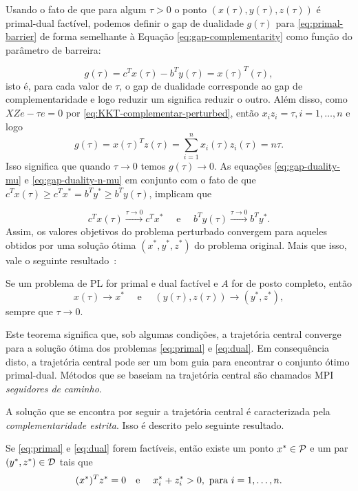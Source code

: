 Usando o fato de que para algum $\tau>0$ o ponto $(x(\tau),y(\tau),z(\tau))$ é
primal-dual factível, podemos definir o gap de dualidade $g(\tau)$ para \eqref{eq:primal-barrier}
de forma semelhante à Equação \eqref{eq:gap-complementarity} como função do
parâmetro de barreira:

\begin{equation}
\label{eq:gap-duality-mu}
g(\tau) = c^Tx(\tau) - b^Ty(\tau) =
x(\tau)^T(\tau),
\end{equation}
isto é, para cada valor de $\tau$, o gap de dualidade corresponde ao gap de
complementaridade e logo reduzir um significa reduzir o outro. Além disso, como
$XZe - \tau e = 0$ por \eqref{eq:KKT-complementar-perturbed}, então $x_iz_i =
\tau, i=1,\dotsc,n$ e logo
 \begin{equation}
\label{eq:gap-duality-n-mu}
g(\tau) = x(\tau)^Tz(\tau)= \sum_{i=1}^nx_i(\tau)z_i(\tau) = n\tau.
\end{equation}
Isso significa que quando $\tau\to 0$ temos $g(\tau) \to 0$. As equações
\eqref{eq:gap-duality-mu} e \eqref{eq:gap-duality-n-mu} em conjunto com o fato
de que $c^T x (\tau) \geq c^Tx^* = b^T y^* \geq b^Ty(\tau)$, implicam que

 \[ c^Tx(\tau) \xrightarrow{\tau \to 0} c^Tx^* \quad \text{ e } \quad b^Ty(\tau)
 \xrightarrow{\tau \to 0} b^Ty^*.
\] Assim, os valores objetivos do problema perturbado convergem para aqueles
obtidos por uma solução ótima $(x^*,y^*,z^*)$ do problema original. Mais que isso, vale
o seguinte resultado~\cite{Meggido:Pathways-to-the-optimal:1988u}:
 
 
 \begin{teo}\label{teo:xmu-to-xstar}
 Se um problema de \ac{PL} for primal e dual factível e 
 $A$ for de posto completo, então
  \[
 x(\tau) \to x^* \quad \text{ e } \quad 
 (y(\tau),z(\tau))  \to (y^*,z^*),
\]
sempre que   $\tau\to0$.
 \end{teo}
 
 Este teorema significa que, sob algumas condições, a trajetória central
 converge para a solução ótima dos problemas \eqref{eq:primal} e
 \eqref{eq:dual}. Em consequência disto, a trajetória central  pode ser um bom
 guia para encontrar o conjunto ótimo primal-dual. Métodos que se baseiam na
 trajetória central são chamados \acl{MPI}
\emph{seguidores de caminho}.
 


A solução que se encontra por seguir a trajetória central é caracterizada pela
\emph{complementaridade estrita}. Isso é descrito pelo seguinte resultado.
\begin{teo}\label{thm:strict_complementarity}
Se \eqref{eq:primal} e \eqref{eq:dual} forem factíveis, então existe um ponto
$x^*\in\mathcal{P}$ e um par $(y^*,z^*)\in\mathcal{D}$ tais que 
\[
(x^*)^Tz^* = 0 \text{\quad e \quad} x^*_i+ z^*_i >0, \text{ para }i=1,\ldots,n.
\]
\end{teo}

